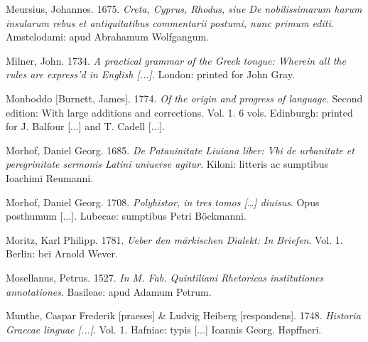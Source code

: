 \begin{styleStandard}
Meursius, Johannes. 1675. \textit{Creta, Cyprus, Rhodus, siue De nobilissimarum harum insularum rebus et antiquitatibus commentarii postumi, nunc primum editi}. Amstelodami: apud Abrahamum Wolfgangum.
\end{styleStandard}

\begin{styleStandard}
Milner, John. 1734. \textit{A practical grammar of the Greek tongue: Wherein all the rules are express’d in English [...]}. London: printed for John Gray.
\end{styleStandard}

\begin{styleStandard}
Monboddo [Burnett, James]. 1774. \textit{Of the origin and progress of language}. Second edition: With large additions and corrections. Vol. 1. 6 vols. Edinburgh: printed for J. Balfour [...] and T. Cadell [...].
\end{styleStandard}

\begin{styleStandard}
Morhof, Daniel Georg. 1685. \textit{De Patauinitate Liuiana liber: Vbi de urbanitate et peregrinitate sermonis Latini uniuerse agitur}. Kiloni: litteris ac sumptibus Ioachimi Reumanni.
\end{styleStandard}

\begin{styleStandard}
Morhof, Daniel Georg. 1708. \textit{Polyhistor, in tres tomos […] diuisus}. Opus posthumum [...]. Lubecae: sumptibus Petri Böckmanni.
\end{styleStandard}

\begin{styleStandard}
Moritz, Karl Philipp. 1781. \textit{Ueber den märkischen Dialekt: In Briefen}. Vol. 1. Berlin: bei Arnold Wever.
\end{styleStandard}

\begin{styleStandard}
Mosellanus, Petrus. 1527. \textit{In M. Fab. Quintiliani Rhetoricas institutiones annotationes}. Basileae: apud Adamum Petrum.
\end{styleStandard}

\begin{styleStandard}
Munthe, Caspar Frederik [praeses] \& Ludvig Heiberg [respondens]. 1748. \textit{Historia Graecae linguae [...]}. Vol. 1. Hafniae: typis [...] Ioannis Georg. Høpffneri.
\end{styleStandard}

